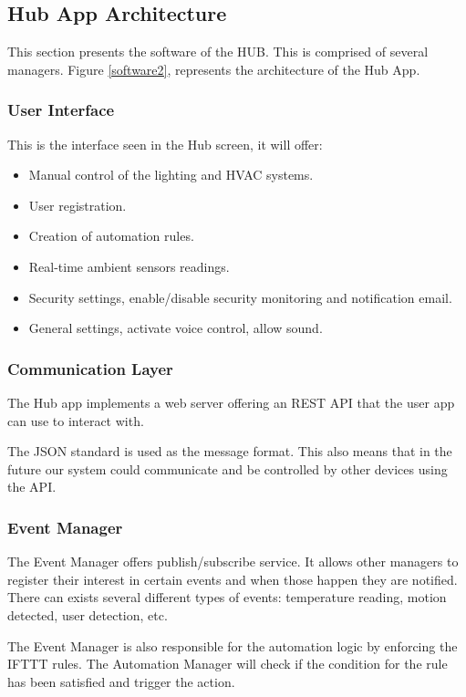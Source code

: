 \subsection{Hub App Architecture}

This section presents the software of the HUB. This is comprised of several managers. Figure \ref{software2}, represents the architecture of the Hub App.

\subsubsection{User Interface}
This is the interface seen in the Hub screen, it will offer:

\begin{itemize}
  \item Manual control of the lighting and HVAC systems.
  \item User registration.
  \item Creation of automation rules.
  \item Real-time ambient sensors readings.
  \item Security settings, enable/disable security monitoring and notification email.
  \item General settings, activate voice control, allow sound.
   
\end{itemize}

\subsubsection{Communication Layer}

The Hub app implements a web server offering an \ac{REST} \ac{API} that the user app can use to interact with. 

The \ac{JSON} standard is used as the message format. This also means that in the future our system could communicate and be controlled by other devices using the \ac{API}.

\subsubsection{Event Manager}
The Event Manager offers publish/subscribe service. It allows other managers to register their interest in certain events and when those happen they are notified. There can exists several different types of events: temperature reading, motion detected, user detection, etc.

The Event Manager is also responsible for the automation logic by enforcing the \ac{IFTTT} rules. The Automation Manager will check if the condition for the rule has been satisfied and trigger the action. 

